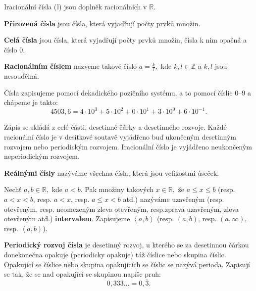 Iracionální čísla ($\mathbb{I}$) jsou doplněk racionálních v $\mathbb{R}$.

\begin{definition}
  \textbf{Přirozená čísla} jsou čísla, která vyjadřují počty prvků množin.
\end{definition}

\begin{definition}
  \textbf{Celá čísla} jsou čísla, která vyjadřují počty prvků množin, čísla k nim opačná a číslo 0.
\end{definition}

\begin{definition}
  \textbf{Racionálním číslem} nazveme takové číslo $a = \frac{k}{l},$ kde $ k, l \in \mathbb{Z}$ a $k,l$ jsou nesoudělná.
\end{definition}

\begin{pozn}
  Čísla zapisujeme pomocí dekadického pozičního systému, a to pomocí číslic 0--9 a chápeme je takto:
  $$4503,6=4\cdot 10^3+5\cdot 10^2 + 0 \cdot 10^1 + 3\cdot 10^0 + 6 \cdot 10^{-1}.$$

  Zápis se skládá z celé části, desetinné čárky a desetinného rozvoje. Každé racionální číslo je v desítkové soutavě vyjádřeno buď ukončeným desetinným rozvojem nebo periodickým rozvojem. Iracionální číslo je vyjádřeno neukončeným neperiodickým rozvojem.
\end{pozn}

\begin{definition}
  \textbf{Reálnými čísly} nazýváme všechna čísla, která jsou velikostmi úseček.
\end{definition}

\begin{definition}
  Nechť $a,b \in \mathbb{R},$ kde $a<b$. Pak množiny takových $x\in \mathbb{R},$ že $a\leq x\leq b$ (resp. $a < x < b$, resp. $a < x$, resp. $a \leq x < b$ atd.) nazýváme uzavřeným (resp. otevřeným, resp. neomezeným zleva otevřeným, resp.zprava uzavřeným, zleva otevřeným atd.) \textbf{intervalem}. Zapisujeme $\left<a,b\right>$ (resp. $\left(a,b\right)$, resp. $(a, \infty)$, resp. $\left<a, b\right)$).
\end{definition}

\begin{definition}
  \textbf{Periodický rozvoj čísla} je desetinný rozvoj, u kterého se za desetinnou čárkou donekonečna opakuje (periodicky opakuje) táž číslice nebo skupina číslic. Opakující se číslice nebo skupina opakujících se číslic se nazývá perioda. Zapisují se tak, že se nad opakující se skupinou napíše pruh:
  $$0,333 \dots = 0,\overline{3}.$$
\end{definition}

